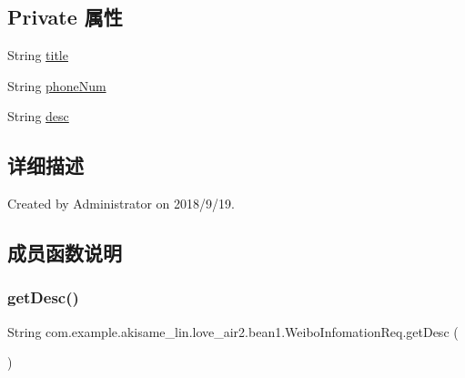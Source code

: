 \subsection*{Private 属性}
\begin{DoxyCompactItemize}
\item 
String \mbox{\hyperlink{classcom_1_1example_1_1akisame__lin_1_1love__air2_1_1bean1_1_1_weibo_infomation_req_a1483e7293ba0d91b5622854fd771e0b8}{title}}
\item 
String \mbox{\hyperlink{classcom_1_1example_1_1akisame__lin_1_1love__air2_1_1bean1_1_1_weibo_infomation_req_ad7f7a2b2c02f6116193f68991a2ddfee}{phone\+Num}}
\item 
String \mbox{\hyperlink{classcom_1_1example_1_1akisame__lin_1_1love__air2_1_1bean1_1_1_weibo_infomation_req_a3f161379e3449060e9ac2322680e58b9}{desc}}
\end{DoxyCompactItemize}


\subsection{详细描述}
Created by Administrator on 2018/9/19. 

\subsection{成员函数说明}
\mbox{\label{classcom_1_1example_1_1akisame__lin_1_1love__air2_1_1bean1_1_1_weibo_infomation_req_acb27ea114609a6d33cdab9ef9b9e9aa7}} 
\subsubsection{\texorpdfstring{getDesc()}{getDesc()}}
{\footnotesize\ttfamily String com.\+example.\+akisame\+\_\+lin.\+love\+\_\+air2.\+bean1.\+Weibo\+Infomation\+Req.\+get\+Desc (\begin{DoxyParamCaption}{ }\end{DoxyParamCaption})\hspace{0.3cm}{\ttfamily [inline]}}

\mbox{\label{classcom_1_1example_1_1akisame__lin_1_1love__air2_1_1bean1_1_1_weibo_infomation_req_aa3a80df57ffabafe5b8158b85b36a490}} 
